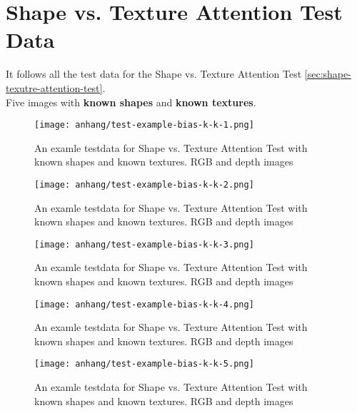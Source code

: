 \chapter{Shape vs. Texture Attention Test Data}
\label{appendix:testdata-examples-bias}

	It follows all the test data for the Shape vs. Texture Attention Test \ref{sec:shape-texutre-attention-test}.\\
	Five images with \textbf{known shapes} and \textbf{known textures}.
	
	\begin{figure}[H]
		\centering
		\texttt{[image: anhang/test-example-bias-k-k-1.png]}
		\caption[An examle testdata for Shape vs. Texture Attention Test with known shapes and known textures. RGB and depth images]{An examle testdata for Shape vs. Texture Attention Test with known shapes and known textures. RGB and depth images}
	\end{figure}
	\begin{figure}[H]
		\centering
		\texttt{[image: anhang/test-example-bias-k-k-2.png]}
		\caption[An examle testdata for Shape vs. Texture Attention Test with known shapes and known textures. RGB and depth images]{An examle testdata for Shape vs. Texture Attention Test with known shapes and known textures. RGB and depth images}
	\end{figure}
	\begin{figure}[H]
		\centering
		\texttt{[image: anhang/test-example-bias-k-k-3.png]}
		\caption[An examle testdata for Shape vs. Texture Attention Test with known shapes and known textures. RGB and depth images]{An examle testdata for Shape vs. Texture Attention Test with known shapes and known textures. RGB and depth images}
	\end{figure}
	\begin{figure}[H]
		\centering
		\texttt{[image: anhang/test-example-bias-k-k-4.png]}
		\caption[An examle testdata for Shape vs. Texture Attention Test with known shapes and known textures. RGB and depth images]{An examle testdata for Shape vs. Texture Attention Test with known shapes and known textures. RGB and depth images}
	\end{figure}
	\begin{figure}[H]
		\centering
		\texttt{[image: anhang/test-example-bias-k-k-5.png]}
		\caption[An examle testdata for Shape vs. Texture Attention Test with known shapes and known textures. RGB and depth images]{An examle testdata for Shape vs. Texture Attention Test with known shapes and known textures. RGB and depth images}
	\end{figure}

